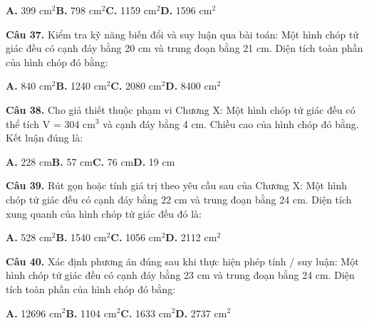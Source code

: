 \documentclass[11pt,a4paper]{article}
\begin{document}
\hspace*{1.5em}\textbf{A.} 399 cm$^2$\quad\quad \textbf{B.} 798 cm$^2$\quad\quad \textbf{C.} 1159 cm$^2$\quad\quad \textbf{D.} 1596 cm$^2$\par\vspace{2pt}
\textbf{\color{primary} Câu 37.} Kiểm tra kỹ năng biến đổi và suy luận qua bài toán: Một hình chóp tứ giác đều có cạnh đáy bằng 20 cm và trung đoạn bằng 21 cm. Diện tích toàn phần của hình chóp đó bằng:\par
\hspace*{1.5em}\textbf{A.} 840 cm$^2$\quad\quad \textbf{B.} 1240 cm$^2$\quad\quad \textbf{C.} 2080 cm$^2$\quad\quad \textbf{D.} 8400 cm$^2$\par\vspace{2pt}
\textbf{\color{primary} Câu 38.} Cho giả thiết thuộc phạm vi Chương X: Một hình chóp tứ giác đều có thể tích V = 304 cm$^3$ và cạnh đáy bằng 4 cm. Chiều cao của hình chóp đó bằng. Kết luận đúng là:\par
\hspace*{1.5em}\textbf{A.} 228 cm\quad\quad \textbf{B.} 57 cm\quad\quad \textbf{C.} 76 cm\quad\quad \textbf{D.} 19 cm\par\vspace{2pt}
\textbf{\color{primary} Câu 39.} Rút gọn hoặc tính giá trị theo yêu cầu sau của Chương X: Một hình chóp tứ giác đều có cạnh đáy bằng 22 cm và trung đoạn bằng 24 cm. Diện tích xung quanh của hình chóp tứ giác đều đó là:\par
\hspace*{1.5em}\textbf{A.} 528 cm$^2$\quad\quad \textbf{B.} 1540 cm$^2$\quad\quad \textbf{C.} 1056 cm$^2$\quad\quad \textbf{D.} 2112 cm$^2$\par\vspace{2pt}
\textbf{\color{primary} Câu 40.} Xác định phương án đúng sau khi thực hiện phép tính / suy luận: Một hình chóp tứ giác đều có cạnh đáy bằng 23 cm và trung đoạn bằng 24 cm. Diện tích toàn phần của hình chóp đó bằng:\par
\hspace*{1.5em}\textbf{A.} 12696 cm$^2$\quad\quad \textbf{B.} 1104 cm$^2$\quad\quad \textbf{C.} 1633 cm$^2$\quad\quad \textbf{D.} 2737 cm$^2$\par\vspace{2pt}
\end{document}
